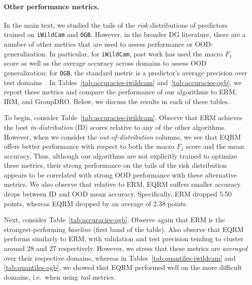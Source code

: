 \documentclass{article}
\begin{document}
%
%
%
%
%
%
%
%
%
%
%
%
%
%
%
%
%
%
%
%
%
%
%
%
%
%
%
%
%
%
%
%
%
%
%
%
%
%
%

%

%

\paragraph{Other performance metrics.}  In the main text, we studied the tails of the \textit{risk} distributions of predictors trained on \texttt{iWildCam} and \texttt{OGB}. However, in the broader DG literature, there are a number of other metrics that are used to assess performance or OOD-generalization. In particular, for \texttt{iWildCam}, past work has used the macro $F_1$ score as well as the average accuracy across domains to assess OOD generalization; for \texttt{OGB}, the standard metric is a predictor's average precision over test domains~\cite{wilds2021}. In Tables~\ref{tab:accuracies-iwildcam} and~\ref{tab:accuracies-ogb}, we report these metrics and compare the performance of our algorithms to ERM, IRM, and GroupDRO. Below, we discuss the results in each of these tables.

To begin, consider Table~\ref{tab:accuracies-iwildcam}.  Observe that ERM
%
achieves the best \emph{in-distribution} (ID) scores relative to any of the other algorithms.  However, when we consider the \emph{out-of-distribution} columns, we see that EQRM offers better performance with respect to both the macro $F_1$ score and the mean accuracy.  Thus, although our algorithms are not explicitly trained to optimize these metrics, their strong performance on the tails of the risk distribution appears to be correlated with strong OOD performance with these alternative metrics.  We also observe that relative to ERM, EQRM suffers smaller accuracy drops between ID and OOD mean accuracy. Specifically, ERM dropped 5.50 points, whereas EQRM dropped by an average of 2.38 points.

Next, consider Table~\ref{tab:accuracies-ogb}.  Observe again that ERM is the strongest-performing \textit{baseline} (first band of the table).  Also observe that EQRM performs similarly to ERM, with validation and test precision tending to cluster around 28 and 27 respectively. However, we stress that these metrics are \emph{averaged} over their respective domains, whereas in Tables~\ref{tab:quantiles-iwildcam} and \ref{tab:quantiles-ogb}, we showed that EQRM performed well on the more difficult domains, i.e.\ when using \emph{tail} metrics.
 
\end{document}
